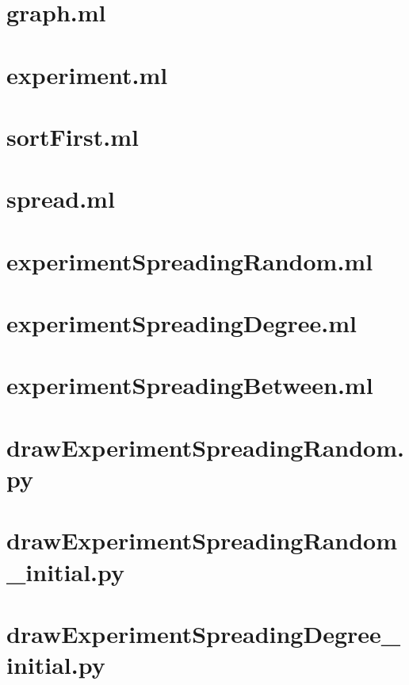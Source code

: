 \documentclass{article}
\begin{document}
\tableofcontents
\newpage

\lstset{language=Caml, tabsize=2}          %
\section{graph.ml}


\section{experiment.ml}


\section{sortFirst.ml}


\section{spread.ml}


\section{experimentSpreadingRandom.ml}


\section{experimentSpreadingDegree.ml}


\section{experimentSpreadingBetween.ml}


\section{drawExperimentSpreadingRandom.py}


\section{drawExperimentSpreadingRandom\_initial.py}


\section{drawExperimentSpreadingDegree\_initial.py}

\end{document}
